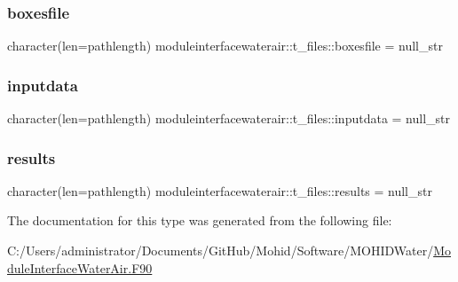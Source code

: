 \subsubsection{\texorpdfstring{boxesfile}{boxesfile}}
{\footnotesize\ttfamily character(len=pathlength) moduleinterfacewaterair\+::t\+\_\+files\+::boxesfile = null\+\_\+str\hspace{0.3cm}{\ttfamily [private]}}

\mbox{\label{structmoduleinterfacewaterair_1_1t__files_a2ee2285ed1037804550ee3649588e5de}} 
\subsubsection{\texorpdfstring{inputdata}{inputdata}}
{\footnotesize\ttfamily character(len=pathlength) moduleinterfacewaterair\+::t\+\_\+files\+::inputdata = null\+\_\+str\hspace{0.3cm}{\ttfamily [private]}}

\mbox{\label{structmoduleinterfacewaterair_1_1t__files_a388d456b957a91401d1033128a4db0dc}} 
\subsubsection{\texorpdfstring{results}{results}}
{\footnotesize\ttfamily character(len=pathlength) moduleinterfacewaterair\+::t\+\_\+files\+::results = null\+\_\+str\hspace{0.3cm}{\ttfamily [private]}}



The documentation for this type was generated from the following file\+:\begin{DoxyCompactItemize}
\item 
C\+:/\+Users/administrator/\+Documents/\+Git\+Hub/\+Mohid/\+Software/\+M\+O\+H\+I\+D\+Water/\mbox{\hyperlink{_module_interface_water_air_8_f90}{Module\+Interface\+Water\+Air.\+F90}}\end{DoxyCompactItemize}
